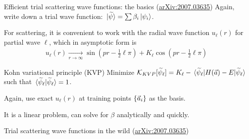 \documentclass[xcolor=dvipsnames, aspectratio=169]{beamer}
\begin{document}
\begin{frame}[t]{Efficient trial scattering wave functions: the basics (\alert{\href{https://arxiv.org/abs/2007.03635}{arXiv:2007.03635}})}
Again, write down a \alert{trial wave function}: $\ket*{\widetilde{\psi}} = \sum \beta_i \ket*{\psi_i}$.

For scattering, it is convenient to work with the radial wave function $u_\ell(r)$ for partial wave $\ell$, which in asymptotic form is
\begin{align}
    u_\ell(r) \xrightarrow[r\to\infty]{} \sin(pr - \frac{1}{2}\ell\pi) + K_\ell \cos(pr - \frac{1}{2}\ell\pi)
\end{align}

\begin{myblock}[valign=center]{Kohn variational principle (KVP)}
Minimize $\mathcal{K}_{KVP}[\widetilde{\psi}_\ell] = K_\ell - \mel*{\widetilde{\psi}_\ell}{H(\vec{a}) - E}{\widetilde{\psi}_\ell}$ such that $\braket*{\widetilde{\psi}_\ell}{\widetilde{\psi}_\ell} = 1$.
\end{myblock}%

Again, use exact $u_\ell(r)$ at training points $\{\vec{a}_i\}$ as the basis.

It is a linear problem, can solve for $\beta$ analytically and quickly.
\end{frame}

\begin{frame}{Trial scattering wave functions in the wild (\alert{\href{https://arxiv.org/abs/2007.03635}{arXiv:2007.03635}})}

\begin{columns}
\begin{column}{0.5\textwidth}
\end{column}
\begin{column}{0.5\textwidth}

\begin{figure}
\end{figure}
\end{column}
\end{columns}
\end{frame}
\end{document}

